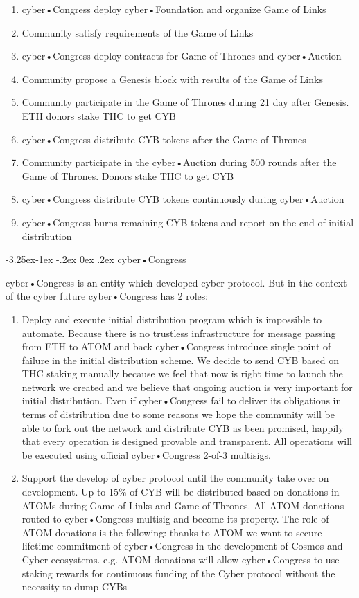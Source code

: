 \documentclass[8pt,oneside]{amsart}
\makeatletter
\renewcommand\subsection{\@startsection{subsection}{2}{\z@}%
                                     {-3.25ex\@plus -1ex \@minus -.2ex}%
                                     {0ex \@plus .2ex}%
                                     {\play\Large}}%
\newcommand{\titleSection}[1]{\subsection{#1}}
\makeatother
\begin{document}
\begin{enumerate}
 \item cyber•Congress deploy cyber•Foundation and organize Game of Links
 \item Community satisfy requirements of the Game of Links
 \item cyber•Congress deploy contracts for Game of Thrones and cyber•Auction
 \item Community propose a Genesis block with results of the Game of Links
 \item Community participate in the Game of Thrones during 21 day after Genesis. ETH donors stake THC to get CYB
 \item cyber•Congress distribute CYB tokens after the Game of Thrones
 \item Community participate in the cyber•Auction during 500 rounds after the Game of Thrones. Donors stake THC to get CYB
 \item cyber•Congress distribute CYB tokens continuously during cyber•Auction
 \item cyber•Congress burns remaining CYB tokens and report on the end of initial distribution
\end{enumerate}

\titleSection{cyber•Congress}\label{cybercongress}

cyber•Congress is an entity which developed cyber protocol. But in the context of the cyber future cyber•Congress has 2 roles:
\begin{enumerate}
 \item Deploy and execute initial distribution program which is impossible to automate. Because there is no trustless infrastructure for message passing from ETH to ATOM and back cyber•Congress introduce single point of failure in the initial distribution scheme. We decide to send CYB based on THC staking manually because we feel that now is right time to launch the network we created and we believe that ongoing auction is very important for initial distribution. Even if cyber•Congress fail to deliver its obligations in terms of distribution due to some reasons we hope the community will be able to fork out the network and distribute CYB as been promised, happily that every operation is designed provable and transparent. All operations will be executed using official cyber•Congress 2-of-3 multisigs.
 \item Support the develop of cyber protocol until the community take over on development. Up to 15\% of CYB will be distributed based on donations in ATOMs during Game of Links and Game of Thrones. All ATOM donations routed to cyber•Congress multisig and become its property. The role of ATOM donations is the following: thanks to ATOM we want to secure lifetime commitment of cyber•Congress in the development of Cosmos and Cyber ecosystems. e.g. ATOM donations will allow cyber•Congress to use staking rewards for continuous funding of the Cyber protocol without the necessity to dump CYBs
\end{enumerate}
\end{document}
